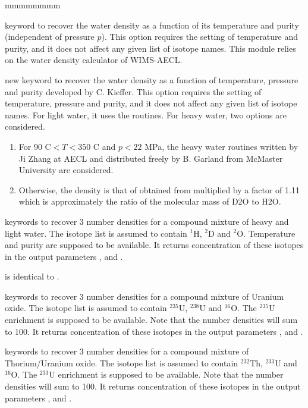 \begin{ListeDeDescription}{mmmmmmmm}
\item[\moc{WATER}] keyword to recover the water density as a
function of its temperature and purity (independent of pressure $p$). This option requires the setting of
temperature and purity, and it does not affect any given list of isotope names. This module relies on the water density calculator of WIMS-AECL.\cite{WIMS}

\item[\moc{PWATER}] new keyword to recover the water density as a
function of temperature, pressure and purity developed by C. Kieffer.\cite{Kieffer} This option requires the setting of
temperature, pressure and purity, and it does not affect any given list of isotope names. For light water, it uses the  routines.\cite{Freesteam} For heavy water, two options are considered.
\begin{enumerate}
\item For $90\text{ C}<T<350\text{ C}$ and $p<22$ MPa, the heavy water routines written by Ji Zhang at AECL and distributed freely by B. Garland from McMaster University are considered.\cite{McMaster}
\item Otherwise, the density is that of obtained from  multiplied by a factor of 1.11 which is approximately the ratio of the molecular mass of D2O to H2O.
\end{enumerate}  

\item[\moc{WGT\%} \moc{D2O}] keywords to recover 3 number densities for a compound
mixture of heavy and light water. The isotope list is assumed to contain $^{1}$H,
$^{2}$D and $^{2}$O. Temperature and purity are supposed to be available. It returns
concentration of these isotopes in the output parameters ,  and
.

\item[\moc{WGT\%} \moc{H2O}] is identical to  .

\item[\moc{WGT\%} \moc{UO2}] keywords to recover 3 number densities for a compound
mixture of Uranium oxide. The isotope list is assumed to contain $^{235}$U,
$^{238}$U and $^{16}$O. The $^{235}$U enrichment is supposed to be available. Note
that the number densities will sum to 100. It returns concentration of these
isotopes in the output parameters ,  and .

\item[\moc{WGT\%} \moc{THO2}] keywords to recover 3 number densities for a compound
mixture of Thorium/Uranium oxide. The isotope list is assumed to contain
$^{232}$Th,  $^{233}$U  and $^{16}$O. The $^{233}$U enrichment is supposed to be
available. Note that the number densities will sum to 100. It returns concentration
of these isotopes in the output parameters ,  and .

\end{ListeDeDescription}

